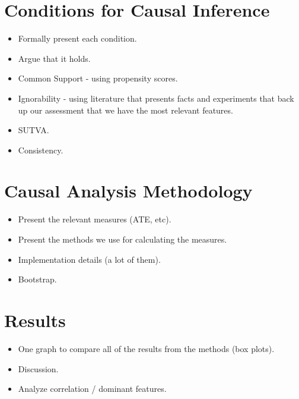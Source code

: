 \documentclass[11pt]{article}
\begin{document}

\section{Conditions for Causal Inference}

\begin{itemize}
    \item Formally present each condition.
    \item Argue that it holds.
    \item Common Support - using propensity scores.
    \item Ignorability - using literature that presents facts and experiments that back up our assessment that we have the most relevant features.
    \item SUTVA.
    \item Consistency.
\end{itemize}

\section{Causal Analysis Methodology}

\begin{itemize}
    \item Present the relevant measures (ATE, etc).
    \item Present the methods we use for calculating the measures.
    \item Implementation details (a lot of them).
    \item Bootstrap.
\end{itemize}

\section{Results}

\begin{itemize}
    \item One graph to compare all of the results from the methods (box plots).
    \item Discussion.
    \item Analyze correlation / dominant features.
\end{itemize}
\end{document}
